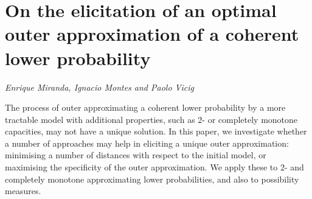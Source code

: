 \documentclass[../booklet.tex]{subfiles}
\begin{document}
\section[On the elicitation of an optimal outer approximation of a coherent lower probability. {\it Enrique Miranda, Ignacio Montes and Paolo Vicig}]{On the elicitation of an optimal outer approximation of a coherent lower probability}
  

\begin{center}
  {\it Enrique Miranda, Ignacio Montes and Paolo Vicig}
\end{center}

\vskip 0.8cm


The process of outer approximating a coherent lower probability by a more tractable model with additional properties, such as 2- or completely monotone capacities, may not have a unique solution. In this paper, we investigate whether a number of approaches may help in eliciting a unique outer approximation: minimising a number of distances with respect to the initial model, or maximising the specificity of the outer approximation. We apply these to 2- and completely monotone approximating lower probabilities, and also to possibility measures.

\end{document}
